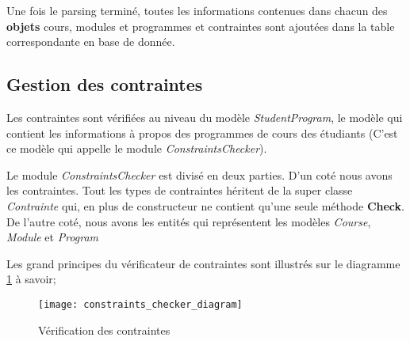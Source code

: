 

Une fois le parsing terminé, toutes les informations contenues dans chacun des \textbf{objets} cours, modules et programmes et contraintes sont ajoutées dans la table correspondante en base de donnée. 


\subsection{Gestion des contraintes}
\label{constraint_mgmt}
Les contraintes sont vérifiées au niveau du modèle \textit{StudentProgram}, le modèle qui contient les informations à propos des programmes de cours des étudiants (C'est ce modèle qui appelle le module \textit{ConstraintsChecker}). 

Le module \textit{ConstraintsChecker} est divisé en deux parties. D'un coté nous avons les contraintes. Tout les types de contraintes héritent de la super classe \textit{Contrainte} qui, en plus de constructeur ne contient qu'une seule méthode \textbf{Check}. De l'autre coté, nous avons les entités qui représentent les modèles \textit{Course}, \textit{Module} et \textit{Program}

Les grand principes du vérificateur de contraintes sont illustrés sur le diagramme \ref{fig:constraint_checker_diagram} à savoir;

\begin{figure}
\centering
\caption{Vérification des contraintes}
\label{fig:constraint_checker_diagram}
\texttt{[image: constraints\_checker\_diagram]}
\end{figure}

